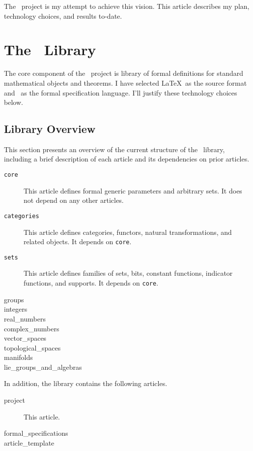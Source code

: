 \documentclass{amsart}
\begin{document}
The \mathz\ project is my attempt to achieve this vision.
This article describes my plan, technology choices, and results to-date.

\section{The \mathz\ Library}

The core component of the \mathz\ project is library of formal definitions for standard mathematical objects and theorems.
I have selected \LaTeX\ as the source format and \ZN\ as the formal specification language.
I'll justify these technology choices below.

\subsection{Library Overview}

This section presents an overview of the current structure of the \mathz\ library, 
including a brief description of each article and its dependencies on prior articles.

\begin{description}
\item[\texttt{core}] This article defines formal generic parameters and arbitrary sets.
It does not depend on any other articles.
\item[\texttt{categories}] This article defines categories, functors, natural transformations, and
related objects.
It depends on \texttt{core}.
\item[\texttt{sets}] This article defines families of sets, bits, constant functions, indicator functions, and supports.
It depends on \texttt{core}.
\item[groups]
\item[integers]
\item[real\_numbers]
\item[complex\_numbers]
\item[vector\_spaces]
\item[topological\_spaces]
\item[manifolds]
\item[lie\_groups\_and\_algebras]
\end{description}

In addition, the library contains the following articles.
\begin{description}
\item[project] This article.
\item[formal\_specifications]
\item[article\_template]
\end{description}
\end{document}
